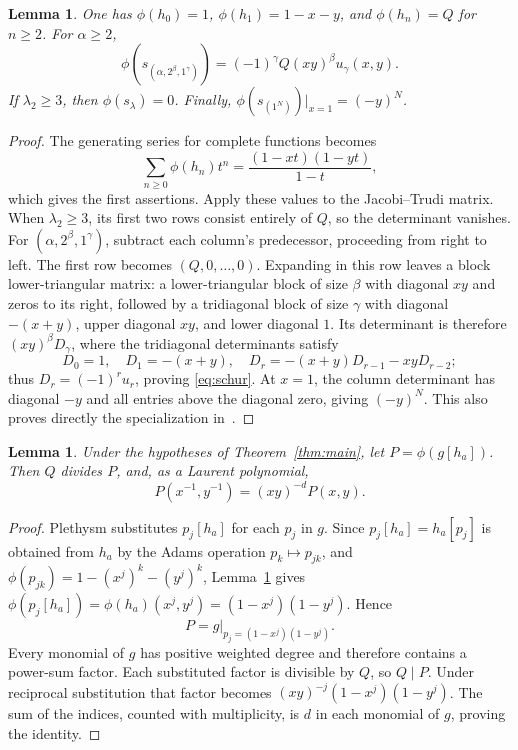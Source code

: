 \documentclass[11pt]{article}
\newtheorem{lemma}[theorem]{Lemma}
\begin{document}
\begin{lemma}\label{lem:schur}
One has $\phi(h_0)=1$, $\phi(h_1)=1-x-y$, and $\phi(h_n)=Q$ for $n\geq2$. For $\alpha\geq2$,
\begin{equation}\label{eq:schur}
 \phi(s_{(\alpha,2^\beta,1^\gamma)})
   =(-1)^\gamma Q(xy)^\beta u_\gamma(x,y).
\end{equation}
If $\lambda_2\geq3$, then $\phi(s_\lambda)=0$. Finally,
$\phi(s_{(1^N)})\big|_{x=1}=(-y)^N$.
\end{lemma}
\begin{proof}
The generating series for complete functions becomes
\[
 \sum_{n\geq0}\phi(h_n)t^n=\frac{(1-xt)(1-yt)}{1-t},
\]
which gives the first assertions. Apply these values to the Jacobi--Trudi matrix. When $\lambda_2\geq3$, its first two rows consist entirely of $Q$, so the determinant vanishes. For $(\alpha,2^\beta,1^\gamma)$, subtract each column's predecessor, proceeding from right to left. The first row becomes $(Q,0,\ldots,0)$. Expanding in this row leaves a block lower-triangular matrix: a lower-triangular block of size $\beta$ with diagonal $xy$ and zeros to its right, followed by a tridiagonal block of size $\gamma$ with diagonal $-(x+y)$, upper diagonal $xy$, and lower diagonal $1$. Its determinant is therefore $(xy)^\beta D_\gamma$, where the tridiagonal determinants satisfy
\[
 D_0=1,\quad D_1=-(x+y),\quad
 D_r=-(x+y)D_{r-1}-xyD_{r-2};
\]
thus $D_r=(-1)^r u_r$, proving \eqref{eq:schur}. At $x=1$, the column determinant has diagonal $-y$ and all entries above the diagonal zero, giving $(-y)^N$. This also proves directly the specialization in~\cite[Lemma 3.8]{GR}.
\end{proof}

\begin{lemma}\label{lem:recip}
Under the hypotheses of Theorem~\ref{thm:main}, let $P=\phi(g[h_a])$. Then $Q$ divides $P$, and, as a Laurent polynomial,
\[
 P(x^{-1},y^{-1})=(xy)^{-d}P(x,y).
\]
\end{lemma}
\begin{proof}
Plethysm substitutes $p_j[h_a]$ for each $p_j$ in $g$. Since $p_j[h_a]=h_a[p_j]$ is obtained from $h_a$ by the Adams operation $p_k\mapsto p_{jk}$, and $\phi(p_{jk})=1-(x^j)^k-(y^j)^k$, Lemma~\ref{lem:schur} gives $\phi(p_j[h_a])=\phi(h_a)(x^j,y^j)=(1-x^j)(1-y^j)$. Hence
\[
 P=g\big|_{p_j=(1-x^j)(1-y^j)}.
\]
Every monomial of $g$ has positive weighted degree and therefore contains a power-sum factor. Each substituted factor is divisible by $Q$, so $Q\mid P$. Under reciprocal substitution that factor becomes $(xy)^{-j}(1-x^j)(1-y^j)$. The sum of the indices, counted with multiplicity, is $d$ in each monomial of $g$, proving the identity.
\end{proof}
\end{document}
